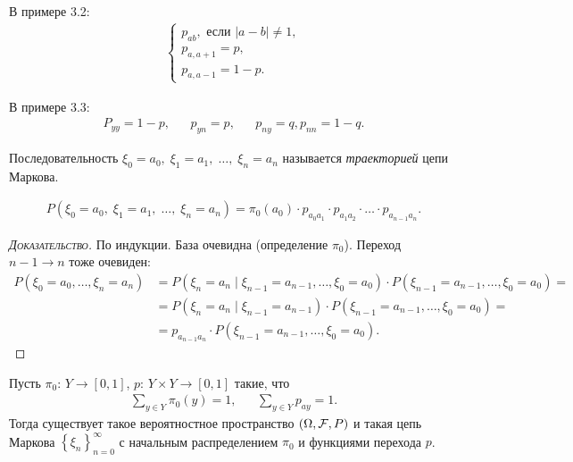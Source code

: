 \documentclass[../main.tex]{subfiles}
\begin{document}
\begin{remrk}
 В примере 3.2:
 \begin{align*}
  \begin{cases}
   p_{ab}, \text{ если } \left| a-b \right| \neq 1, \\
   p_{a,a+1} = p, \\
   p_{a,a-1} = 1-p.
  \end{cases} 
 \end{align*}

 В примере 3.3:
 \begin{align*}
  P_{yy} = 1-p, && p_{yn} = p, && p_{ny} = q, p_{nn} = 1-q.
 \end{align*}
\end{remrk}

\begin{df}
 Последовательность $ \xi_0 = a_0,\; \xi_1 = a_1,\; \ldots,\; \xi_n = a_n $ называется \textit{траекторией} цепи Маркова.
\end{df}

\begin{thm}
 \begin{align*}
  P(\xi_0 = a_0,\; \xi_1 = a_1,\; \ldots,\; \xi_n = a_n) = \pi_0(a_0) \cdot  p_{a_0 a_1} \cdot p_{a_1 a_2} \cdot  \ldots \cdot p_{a_{n-1}a_n}.
 \end{align*}
 \begin{proof}[\normalfont\textsc{Доказательство}]
  По индукции. База очевидна (определение $ \pi_0 $). Переход $ n-1 \to n $ тоже очевиден:
  \begin{align*}
   P(\xi_0 = a_0, \ldots, \xi_n = a_n) &= P(\xi_n = a_n \mid \xi_{n-1} = a_{n-1},\ldots,\xi_0 = a_0) \cdot P(\xi_{n-1} = a_{n-1},\ldots,\xi_0=a_0) = \\
   &= P(\xi_n = a_n \mid \xi_{n-1} = a_{n-1}) \cdot P(\xi_{n-1} = a_{n-1}, \ldots, \xi_0 = a_0) = \\
   &= p_{a_{n-1}a_n} \cdot P(\xi_{n-1} = a_{n-1},\ldots,\xi_0 = a_0).
  \end{align*}
 \end{proof}
\end{thm}

\begin{thm}
 Пусть $ \pi_0 \colon\, Y \to [0,1] $, $ p \colon\, Y \times Y \to [0,1] $ такие, что
 \begin{align*}
  \sum_{y \in Y} \pi_0(y) = 1, && \sum_{y \in Y} p_{ay} = 1.
 \end{align*} Тогда существует такое вероятностное пространство $ (\Omega,\mathcal F,P) $ и такая цепь Маркова $ \left\{\xi_n \right\}_{n=0}^{\infty} $ с начальным распределением $ \pi_0 $ и функциями перехода $ p $.
\end{thm}
\end{document}
